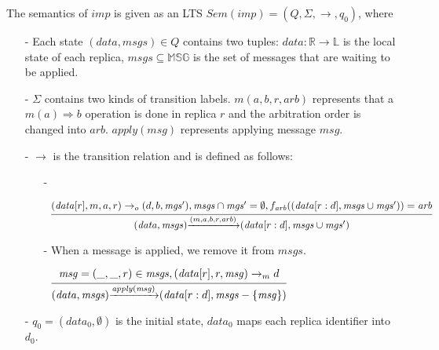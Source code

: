 The semantics of $\mathit{imp}$ is given as an LTS $\mathit{Sem}(\mathit{imp}) = (Q,\Sigma,\rightarrow,q_0)$, where

\begin{itemize}
\setlength{\itemsep}{0.5pt}
\item[-] Each state $(\mathit{data},\mathit{msgs}) \in Q$ contains two tuples: $\mathit{data}: \mathbb{R} \rightarrow \mathbb{L}$ is the local state of each replica, $\mathit{msgs} \subseteq \mathbb{MSG}$ is the set of messages that are waiting to be applied.

\item[-] $\Sigma$ contains two kinds of transition labels. $m(a,b,r,\mathit{arb})$ represents that a $m(a) \Rightarrow b$ operation is done in replica $r$ and the arbitration order is changed into $\mathit{arb}$. $\mathit{apply}(\mathit{msg})$ represents applying message $\mathit{msg}$.

\item[-] $\rightarrow$ is the transition relation and is defined as follows:

    \begin{itemize}
    \setlength{\itemsep}{0.5pt}
    \item[-] %

    $\begin{array}{l c} \bigfrac{ (\mathit{data}[r],m,a,r) \rightarrow_o (d,b,\mathit{mgs}'), \mathit{msgs} \cap \mathit{mgs}' = \emptyset, f_{\mathit{arb}}((\mathit{data}[r:d], \mathit{msgs} \cup \mathit{mgs}')) = \mathit{arb}} {(\mathit{data},\mathit{msgs}) {\xrightarrow{(m,a,b,r,\mathit{arb})}} (\mathit{data}[r:d], \mathit{msgs} \cup \mathit{mgs}')} \end{array}$

    \item[-] {\color {red} When a message is applied, we remove it from $\mathit{msgs}$.}

    $\begin{array}{l c} \bigfrac{ \mathit{msg} = (\_,\_,r) \in \mathit{msgs},(\mathit{data}[r],r,\mathit{msg}) \rightarrow_m d } {(\mathit{data},\mathit{msgs}) {\xrightarrow{\mathit{apply}(\mathit{msg})}} (\mathit{data}[r:d],\mathit{msgs} - \{ \mathit{msg} \})} \end{array}$
    \end{itemize}

\item[-] $q_0 = (data_0,\emptyset)$ is the initial state, $data_0$ maps each replica identifier into $d_0$.
\end{itemize}

